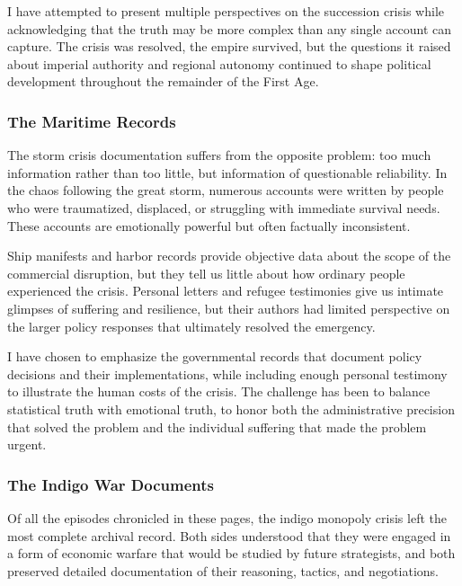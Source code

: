 I have attempted to present multiple perspectives on the succession
crisis while acknowledging that the truth may be more complex than any
single account can capture. The crisis was resolved, the empire
survived, but the questions it raised about imperial authority and
regional autonomy continued to shape political development throughout
the remainder of the First Age.

\subsubsection{The Maritime Records}\label{the-maritime-records}

The storm crisis documentation suffers from the opposite problem: too
much information rather than too little, but information of questionable
reliability. In the chaos following the great storm, numerous accounts
were written by people who were traumatized, displaced, or struggling
with immediate survival needs. These accounts are emotionally powerful
but often factually inconsistent.

Ship manifests and harbor records provide objective data about the scope
of the commercial disruption, but they tell us little about how ordinary
people experienced the crisis. Personal letters and refugee testimonies
give us intimate glimpses of suffering and resilience, but their authors
had limited perspective on the larger policy responses that ultimately
resolved the emergency.

I have chosen to emphasize the governmental records that document policy
decisions and their implementations, while including enough personal
testimony to illustrate the human costs of the crisis. The challenge has
been to balance statistical truth with emotional truth, to honor both
the administrative precision that solved the problem and the individual
suffering that made the problem urgent.

\subsubsection{The Indigo War Documents}\label{the-indigo-war-documents}

Of all the episodes chronicled in these pages, the indigo monopoly
crisis left the most complete archival record. Both sides understood
that they were engaged in a form of economic warfare that would be
studied by future strategists, and both preserved detailed documentation
of their reasoning, tactics, and negotiations.

